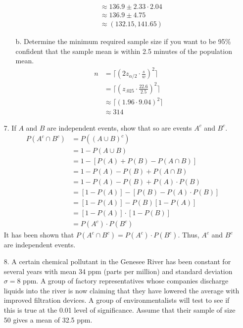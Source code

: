 \documentclass[letterpaper,12pt]{article}
\begin{document}
\begin{enumerate}
\begin{enumerate}
\begin{align*}
          &\approx 136.9 \pm 2.33 \cdot 2.04 \\
          &\approx 136.9 \pm 4.75 \\
          &\approx (132.15, 141.65)
        \end{align*}
      \item[b.]
        Determine the minimum required sample size if you want to be 95\% confident that the sample mean is within 2.5 minutes of the population mean.
        \begin{align*}
          n &= \bigg\lceil \left(2z_{\alpha / 2} \cdot \frac{s}{w}\right)^2 \bigg\rceil \\
          &= \bigg\lceil \left(z_{.025} \cdot \frac{22.6}{2.5}\right)^2 \bigg\rceil \\
          &\approx \big\lceil (1.96 \cdot 9.04)^2 \big\rceil \\
          &\approx 314
        \end{align*}
    \end{enumerate}
  \item[7.]
    If $A$ and $B$ are independent events, show that so are events $A^c$ and $B^c$.
    \begin{align*}
      P(A^c \cap B^c) &= P((A \cup B)^c) \\
      &= 1 - P(A \cup B) \\
      &= 1 - [P(A) + P(B) - P(A \cap B)] \\
      &= 1 - P(A) - P(B) + P(A \cap B) \\
      &= 1 - P(A) - P(B) + P(A) \cdot P(B) \\
      &= [1 - P(A)] - [P(B) - P(A) \cdot P(B)] \\
      &= [1 - P(A)] - P(B)[1 - P(A)] \\
      &= [1 - P(A)] \cdot [1 - P(B)] \\
      &= P(A^c) \cdot P(B^c)
    \end{align*}
    It has been shown that $P(A^c \cap B^c) = P(A^c) \cdot P(B^c)$. Thus, $A^c$ and $B^c$ are independent events.
  \item[8.]
    A certain chemical pollutant in the Genesee River has been constant for several years with mean 34 ppm (parts per million) and standard deviation $\sigma = 8$ ppm. A group of factory representatives whose companies discharge liquids into the river is now claiming that they have lowered the average with improved filtration devices. A group of environmentalists will test to see if this is true at the 0.01 level of significance. Assume that their sample of size 50 gives a mean of 32.5 ppm. \\

\end{enumerate}
\end{document}
